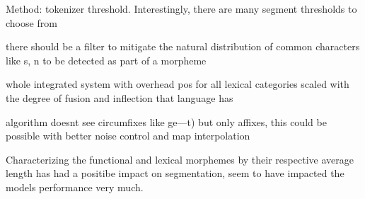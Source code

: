 Method: tokenizer threshold.
Interestingly, there are many segment thresholds to choose from

there should be a filter to mitigate the natural distribution of common characters like s, n to be detected as  part of a morpheme

whole integrated system with overhead pos for all lexical categories
scaled with the degree of fusion and inflection that language has

algorithm doesnt see circumfixes like ge---t) but only affixes, this could be possible with better noise control and map interpolation

Characterizing the functional and lexical morphemes by their respective average length has had a positibe impact on segmentation, seem to have impacted the models performance very much.